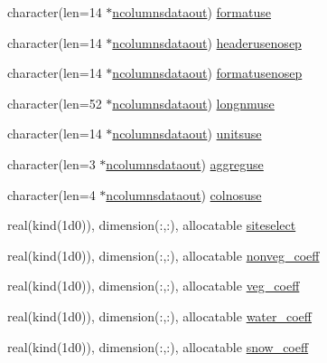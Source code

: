\begin{DoxyCompactItemize}
\item 
character(len=14 $\ast$\hyperlink{namespaceallocatearray_a9408900bed6c87ed095d2c688c1506a0}{ncolumnsdataout}) \hyperlink{namespaceallocatearray_ab9823e63bd1fbe6b3a03661b3f184848}{formatuse}
\item 
character(len=14 $\ast$\hyperlink{namespaceallocatearray_a9408900bed6c87ed095d2c688c1506a0}{ncolumnsdataout}) \hyperlink{namespaceallocatearray_a3c51b4919b1d1ad3e56560fc4409aa43}{headerusenosep}
\item 
character(len=14 $\ast$\hyperlink{namespaceallocatearray_a9408900bed6c87ed095d2c688c1506a0}{ncolumnsdataout}) \hyperlink{namespaceallocatearray_a0e59779b2c97266957b8575e9b411e97}{formatusenosep}
\item 
character(len=52 $\ast$\hyperlink{namespaceallocatearray_a9408900bed6c87ed095d2c688c1506a0}{ncolumnsdataout}) \hyperlink{namespaceallocatearray_a3f68661e372f6193bcfd35d4e245b3bb}{longnmuse}
\item 
character(len=14 $\ast$\hyperlink{namespaceallocatearray_a9408900bed6c87ed095d2c688c1506a0}{ncolumnsdataout}) \hyperlink{namespaceallocatearray_aa6d822a82ea3e0af76f519705a452b0e}{unitsuse}
\item 
character(len=3 $\ast$\hyperlink{namespaceallocatearray_a9408900bed6c87ed095d2c688c1506a0}{ncolumnsdataout}) \hyperlink{namespaceallocatearray_a809990af6a37f51ec5b65de594ab5895}{aggreguse}
\item 
character(len=4 $\ast$\hyperlink{namespaceallocatearray_a9408900bed6c87ed095d2c688c1506a0}{ncolumnsdataout}) \hyperlink{namespaceallocatearray_a8aab8dd16a4f4d4cbc17b0057b356ccb}{colnosuse}
\item 
real(kind(1d0)), dimension(\+:,\+:), allocatable \hyperlink{namespaceallocatearray_a08dfc69cdb208d383ab68d12d7424eb9}{siteselect}
\item 
real(kind(1d0)), dimension(\+:,\+:), allocatable \hyperlink{namespaceallocatearray_a3bc78607c50c9b5b7ce41298703bb51a}{nonveg\+\_\+coeff}
\item 
real(kind(1d0)), dimension(\+:,\+:), allocatable \hyperlink{namespaceallocatearray_ae6d924183e0a7e4015250d825d997423}{veg\+\_\+coeff}
\item 
real(kind(1d0)), dimension(\+:,\+:), allocatable \hyperlink{namespaceallocatearray_ad52819ac6636f70c1067c6d2e645e542}{water\+\_\+coeff}
\item 
real(kind(1d0)), dimension(\+:,\+:), allocatable \hyperlink{namespaceallocatearray_aacffb567ae9e14682180226d82bc8c62}{snow\+\_\+coeff}
\item 

\end{DoxyCompactItemize}
